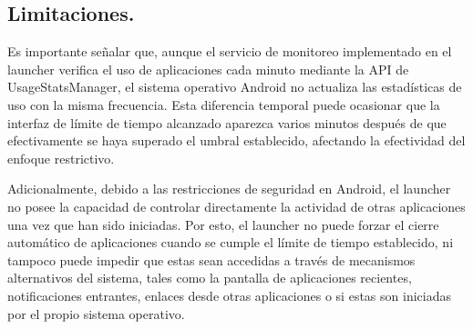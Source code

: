 \subsection{Limitaciones.}

Es importante señalar que, aunque el servicio de monitoreo implementado en el launcher verifica el uso de aplicaciones cada minuto mediante la API de UsageStatsManager, el sistema operativo Android no actualiza las estadísticas de uso con la misma frecuencia. Esta diferencia temporal puede ocasionar que la interfaz de límite de tiempo alcanzado aparezca varios minutos después de que efectivamente se haya superado el umbral establecido, afectando la efectividad del enfoque restrictivo. 

Adicionalmente, debido a las restricciones de seguridad en Android, el launcher no posee la capacidad de controlar directamente la actividad de otras aplicaciones una vez que han sido iniciadas. Por esto, el launcher no puede forzar el cierre automático de aplicaciones cuando se cumple el límite de tiempo establecido, ni tampoco puede impedir que estas sean accedidas a través de mecanismos alternativos del sistema, tales como la pantalla de aplicaciones recientes, notificaciones entrantes, enlaces desde otras aplicaciones o si estas son iniciadas por el propio sistema operativo.